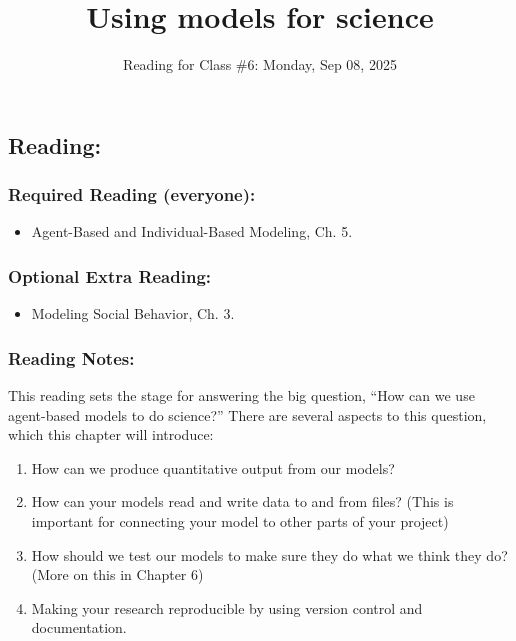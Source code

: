 \documentclass[
]{article}
\title{Using models for science}
\author{}
\date{\vspace{-2.5em}Reading for Class \#6: Monday, Sep 08, 2025}
\providecommand{\tightlist}{%
  \setlength{\itemsep}{0pt}\setlength{\parskip}{0pt}}
\begin{document}
\maketitle

{
\setcounter{tocdepth}{2}
\tableofcontents
}
\subsection{Reading:}\label{reading}

\subsubsection{Required Reading
(everyone):}\label{required-reading-everyone}

\begin{itemize}
\tightlist
\item
  Agent-Based and Individual-Based Modeling, Ch. 5.
\end{itemize}

\subsubsection{Optional Extra Reading:}\label{optional-extra-reading}

\begin{itemize}
\tightlist
\item
  Modeling Social Behavior, Ch. 3.
\end{itemize}

\subsubsection{Reading Notes:}\label{reading-notes}

This reading sets the stage for answering the big question, ``How can we
use agent-based models to do science?'' There are several aspects to
this question, which this chapter will introduce:

\begin{enumerate}
\def\labelenumi{\arabic{enumi}.}
\tightlist
\item
  How can we produce quantitative output from our models?
\item
  How can your models read and write data to and from files? (This is
  important for connecting your model to other parts of your project)
\item
  How should we test our models to make sure they do what we think they
  do? (More on this in Chapter 6)
\item
  Making your research reproducible by using version control and
  documentation.
\end{enumerate}
\end{document}

